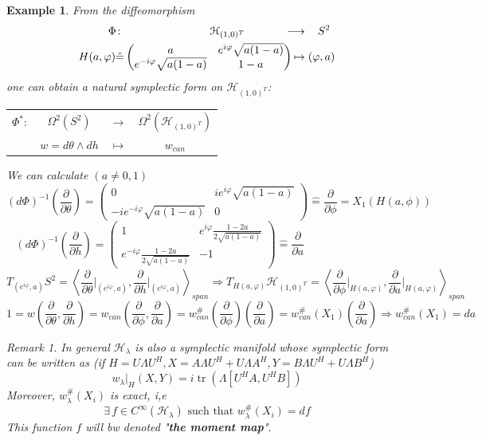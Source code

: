 \documentclass[11pt]{amsart}
\numberwithin{equation}{section}
\theoremstyle{plain}
\newtheorem{eg}[theorem]{Example}
\theoremstyle{plain}
\numberwithin{equation}{section}
\theoremstyle{remark}
\newtheorem{remark}[theorem]{Remark}
\DeclareMathOperator{\tr}{tr}
\begin{document}
\begin{eg}
	\label{eg:s1}
	From the diffeomorphism
	\begin{equation*}
	\begin{aligned}	
	\Phi \colon &\hspace{2.7cm} \mathcal{H}_{(1,0)^T} &\longrightarrow &\hspace{.4cm}  S^2 \\
	H(a,\varphi)\hat{=}&\begin{pmatrix}
	a & e^{i\varphi} \sqrt{a(1-a)} \\
	e^{-i\varphi} \sqrt{a(1-a)} & 1-a
	\end{pmatrix}\hspace{-0.5cm} &\mapsto &\;(\varphi , a)
	\end{aligned}
	\end{equation*}
	one can obtain a natural symplectic form on $\mathcal{H}_{(1,0)^T}$:
	\begin{center}
		\begin{tabular}	{lccc}
			$\Phi^* \colon$ &$\Omega^2(S^2)$ &$\longrightarrow$&$\Omega^2(\mathcal{H}_{(1,0)^T})$ \\
		& $w=d\theta \wedge dh$&$\mapsto$&$ w_{can}$
		\end{tabular}
	\end{center}


	We can calculate $(a\neq 0,1)$
	$$(d\Phi)^{-1}(\frac{\partial}{\partial \theta})= 
	\begin{pmatrix}
	0 & ie^{i\varphi} \sqrt{a(1-a)} \\
	-ie^{-i\varphi} \sqrt{a(1-a)} & 0
	\end{pmatrix}\hat{=}\frac{\partial}{\partial \phi}
	=X_1(H(a,\phi))
	$$
		$$(d\Phi)^{-1}(\frac{\partial}{\partial h})= 
	\begin{pmatrix}
	1 & e^{i\varphi} \displaystyle\frac{ 1-2a}{2\sqrt{a(1-a)}} \\
	e^{-i\varphi} \displaystyle\frac{1-2a}{2\sqrt{a(1-a)}} & -1
	\end{pmatrix}\hat{=}\frac{\partial}{\partial a}
	\phantom{=X_1(H(a,\phi))}
	$$
	$$T_{(e^{i\varphi},a)}S^2=\left<\frac{\partial}{\partial \theta}\bigg|_{(e^{i\varphi},a)},\frac{\partial}{\partial h}\bigg|_{(e^{i\varphi},a)}\right>_{\!\!span}
	\Rightarrow
	T_{H(a,\varphi)}\mathcal{H}_{(1,0)^T}=\left<\frac{\partial}{\partial \phi}\bigg|_{H(a,\varphi)},\frac{\partial}{\partial a}\bigg|_{H(a,\varphi)}\right>_{\!\!span}
	$$
	$$1=w(\frac{\partial}{\partial \theta},\frac{\partial}{\partial h}) = w_{can}(\frac{\partial}{\partial \phi},\frac{\partial}{\partial a})=
	w_{can}^\#(\frac{\partial}{\partial \phi})(\frac{\partial}{\partial a})=
	w_{can}^\#(X_1)(\frac{\partial}{\partial a})
\Rightarrow w_{can}^\#(X_1)=da$$
	\begin{remark}
		In general $\mathcal{H}_\lambda$ is also a symplectic manifold whose symplectic form can be written as (if $H=U\Lambda U^H, X=A\Lambda U^H+U\Lambda A^H, Y=B\Lambda U^H+U\Lambda B^H$)
		$$w_\lambda \big|_H(X,Y)=i \tr (\Lambda[U^HA,U^HB])$$
		Moreover, $w_\lambda^\#(X_i)$ is exact, i,e
		$$\exists\, f \in C^{\infty}(\mathcal{H}_\lambda) \text{ such that } w_\lambda^\#(X_i)=df$$
		This function $f$ will bw denoted "\textbf{the moment map}".
		

\end{remark}
\end{eg}
\end{document}
